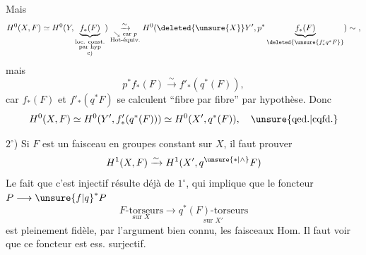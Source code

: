 
Mais
\[
H^0(X,F)\simeq H^0(Y,\underbrace{f_*(F)}_{\substack{\text{loc. const.}\\\text{par hyp}\\\text{c)}}})
\underset{\substack{\searrow\ \text{car }p\\\text{Hot-équiv.}}}{\xrightarrow{\sim}}
H^0(\deleted{\unsure{X}}Y',p^*\underbrace{f_*(F)}_{\deleted{\unsure{f'_*q^*F}}})\sim\ ,
\]
mais
\[
p^*f_*(F)\xrightarrow{\sim} f'_*(q^*(F)),
\]
car $f_*(F)$ et $f'_*(q^*F)$ se calculent ``fibre par
fibre'' par hypothèse. Donc
\[
H^0(X,F)\simeq H^0(Y',f'_*(q^*(F)))\simeq H^0(X',q^*(F)),\quad\text{\unsure{qed.|cqfd.}}
\]

$2^\circ$) Si $F$ est un faisceau en groupes  constant sur $X$,
il faut prouver
\[
H^1(X,F)\xrightarrow{\sim}H^1(X',q^{\unsure{*|\wedge}}F)
\]
Le fait que c'est injectif résulte déjà de $1^\circ$,
qui implique que le foncteur $P\longrightarrow \unsure{f|q}^*P$
\[
\underset{\text{sur }X}{F\text{-torseurs}}\longrightarrow
\underset{\text{sur }X'}{q^*(F)\text{-torseurs}}
\]
est pleinement fidèle, par l'argument bien
connu,  les faisceaux $\mathrm{Hom}$. Il
faut voir que ce foncteur est ess. surjectif.



